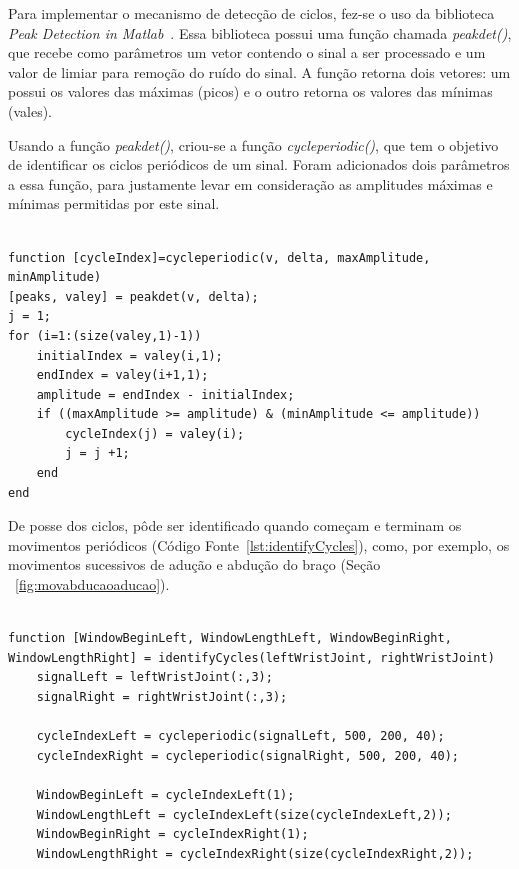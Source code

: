 Para implementar o mecanismo de detecção de ciclos, fez-se o uso da biblioteca \textit{Peak Detection in Matlab}~\cite{peakdetect}. Essa biblioteca possui uma função chamada \textit{peakdet()}, que recebe como parâmetros um vetor contendo o sinal a ser processado e um valor de limiar para remoção do ruído do sinal. A função retorna dois vetores: um possui os valores das máximas (picos) e o outro retorna os valores das mínimas (vales).

Usando a função \textit{peakdet()}, criou-se a função \textit{cycleperiodic()}, que tem o objetivo de identificar os ciclos periódicos de um sinal. Foram adicionados dois parâmetros a essa função, para justamente levar em consideração as amplitudes máximas e mínimas permitidas por este sinal.

\begin{lstlisting}[frame=single, caption=Função de Ciclo Periódico]  % Start your code-block

function [cycleIndex]=cycleperiodic(v, delta, maxAmplitude, minAmplitude)
[peaks, valey] = peakdet(v, delta);
j = 1;
for (i=1:(size(valey,1)-1))    
    initialIndex = valey(i,1);
    endIndex = valey(i+1,1);
    amplitude = endIndex - initialIndex;
    if ((maxAmplitude >= amplitude) & (minAmplitude <= amplitude))
        cycleIndex(j) = valey(i);
        j = j +1;
    end
end
\end{lstlisting}

De posse dos ciclos, pôde ser identificado quando começam e terminam os movimentos periódicos (Código Fonte~\ref{lst:identifyCycles}), como, por exemplo, os movimentos sucessivos de adução e abdução do braço (Seção ~\ref{fig:movabducaoaducao}). 

\begin{lstlisting}[frame=single, caption=Identificar Início e Tamanho do Movimento Periódico, label=lst:identifyCycles]  % Start your code-block

function [WindowBeginLeft, WindowLengthLeft, WindowBeginRight, WindowLengthRight] = identifyCycles(leftWristJoint, rightWristJoint)
    signalLeft = leftWristJoint(:,3);
    signalRight = rightWristJoint(:,3);

    cycleIndexLeft = cycleperiodic(signalLeft, 500, 200, 40);
    cycleIndexRight = cycleperiodic(signalRight, 500, 200, 40);

    WindowBeginLeft = cycleIndexLeft(1);
    WindowLengthLeft = cycleIndexLeft(size(cycleIndexLeft,2));
    WindowBeginRight = cycleIndexRight(1);
    WindowLengthRight = cycleIndexRight(size(cycleIndexRight,2));
\end{lstlisting}

